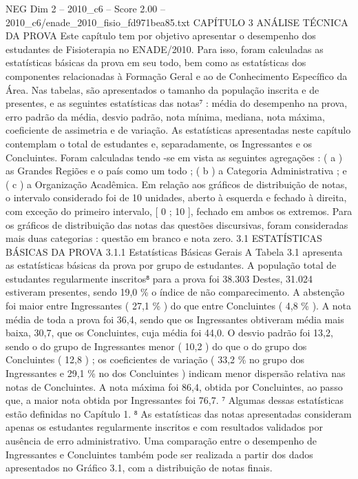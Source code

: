\begin{textsample}{NEG Dim 2 – 2010\_c6 – Score 2.00 – 2010\_c6/enade\_2010\_fisio\_fd971bea85.txt}  \label{ex:f2_neg_255}
CAPÍTULO 3 ANÁLISE TÉCNICA DA PROVA Este capítulo tem por objetivo apresentar o desempenho dos estudantes de Fisioterapia no ENADE/2010.
Para isso, foram calculadas as estatísticas básicas da prova em seu todo, bem como as estatísticas dos componentes relacionadas à Formação Geral e ao de Conhecimento Específico da Área.
Nas tabelas, são apresentados o tamanho da população inscrita e de presentes, e as seguintes estatísticas das notas⁷ : média do desempenho na prova, erro padrão da média, desvio padrão, nota mínima, mediana, nota máxima, coeficiente de assimetria e de variação.
As estatísticas apresentadas neste capítulo contemplam o total de estudantes e, separadamente, os Ingressantes e os Concluintes.
Foram calculadas tendo -se em vista as seguintes agregações : ( a ) as Grandes Regiões e o país como um todo ; ( b ) a Categoria Administrativa ; e ( c ) a Organização Acadêmica.
Em relação aos gráficos de distribuição de notas, o intervalo considerado foi de 10 unidades, aberto à esquerda e fechado à direita, com exceção do primeiro intervalo, [ 0 ; 10 ], fechado em ambos os extremos.
Para os gráficos de distribuição das notas das questões discursivas, foram consideradas mais duas categorias : questão em branco e nota zero. 3.1 ESTATÍSTICAS BÁSICAS DA PROVA 3.1.1 Estatísticas Básicas Gerais A Tabela 3.1 apresenta as estatísticas básicas da prova por grupo de estudantes.
A população total de estudantes regularmente inscritos⁸ para a prova foi 38.303 Destes, 31.024 estiveram presentes, sendo 19,0 \% o índice de não comparecimento.
A abstenção foi maior entre Ingressantes ( 27,1 \% ) do que entre Concluintes ( 4,8 \% ).
A nota média de toda a prova foi 36,4, sendo que os Ingressantes obtiveram média mais baixa, 30,7, que os Concluintes, cuja média foi 44,0.
O desvio padrão foi 13,2, sendo o do grupo de Ingressantes menor ( 10,2 ) do que o do grupo dos Concluintes ( 12,8 ) ; os coeficientes de variação ( 33,2 \% no grupo dos Ingressantes e 29,1 \% no dos Concluintes ) indicam menor dispersão relativa nas notas de Concluintes.
A nota máxima foi 86,4, obtida por Concluintes, ao passo que, a maior nota obtida por Ingressantes foi 76,7. ⁷ Algumas dessas estatísticas estão definidas no Capítulo 1. ⁸ As estatísticas das notas apresentadas consideram apenas os estudantes regularmente inscritos e com resultados validados por ausência de erro administrativo.
Uma comparação entre o desempenho de Ingressantes e Concluintes também pode ser realizada a partir dos dados apresentados no Gráfico 3.1, com a distribuição de notas finais.

\end{textsample}
